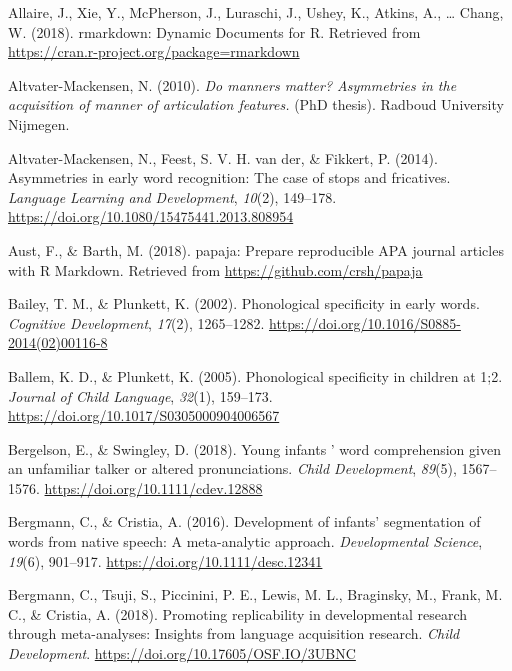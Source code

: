\documentclass[
  english,
  man, noextraspace]{apa6}
\newlength{\cslhangindent}
\newenvironment{cslreferences}%
  {\setlength{\parindent}{0pt}%
  \everypar{\setlength{\hangindent}{\cslhangindent}}\ignorespaces}%
  {\par}
\begin{document}
\hypertarget{refs}{}
\begin{cslreferences}
\leavevmode\hypertarget{ref-RMarkdown}{}%
Allaire, J., Xie, Y., McPherson, J., Luraschi, J., Ushey, K., Atkins, A., \ldots{} Chang, W. (2018). rmarkdown: Dynamic Documents for R. Retrieved from \url{https://cran.r-project.org/package=rmarkdown}

\leavevmode\hypertarget{ref-Altvater2010}{}%
Altvater-Mackensen, N. (2010). \emph{Do manners matter? Asymmetries in the acquisition of manner of articulation features.} (PhD thesis). Radboud University Nijmegen.

\leavevmode\hypertarget{ref-Altvater2014}{}%
Altvater-Mackensen, N., Feest, S. V. H. van der, \& Fikkert, P. (2014). Asymmetries in early word recognition: The case of stops and fricatives. \emph{Language Learning and Development}, \emph{10}(2), 149--178. \url{https://doi.org/10.1080/15475441.2013.808954}

\leavevmode\hypertarget{ref-papaja}{}%
Aust, F., \& Barth, M. (2018). papaja: Prepare reproducible APA journal articles with R Markdown. Retrieved from \url{https://github.com/crsh/papaja}

\leavevmode\hypertarget{ref-Bailey2002}{}%
Bailey, T. M., \& Plunkett, K. (2002). Phonological specificity in early words. \emph{Cognitive Development}, \emph{17}(2), 1265--1282. \url{https://doi.org/10.1016/S0885-2014(02)00116-8}

\leavevmode\hypertarget{ref-Ballem2005}{}%
Ballem, K. D., \& Plunkett, K. (2005). Phonological specificity in children at 1;2. \emph{Journal of Child Language}, \emph{32}(1), 159--173. \url{https://doi.org/10.1017/S0305000904006567}

\leavevmode\hypertarget{ref-Bergelson2017}{}%
Bergelson, E., \& Swingley, D. (2018). Young infants ' word comprehension given an unfamiliar talker or altered pronunciations. \emph{Child Development}, \emph{89}(5), 1567--1576. \url{https://doi.org/10.1111/cdev.12888}

\leavevmode\hypertarget{ref-Bergmann2016}{}%
Bergmann, C., \& Cristia, A. (2016). Development of infants' segmentation of words from native speech: A meta-analytic approach. \emph{Developmental Science}, \emph{19}(6), 901--917. \url{https://doi.org/10.1111/desc.12341}

\leavevmode\hypertarget{ref-Bergmann2018}{}%
Bergmann, C., Tsuji, S., Piccinini, P. E., Lewis, M. L., Braginsky, M., Frank, M. C., \& Cristia, A. (2018). Promoting replicability in developmental research through meta-analyses: Insights from language acquisition research. \emph{Child Development}. \url{https://doi.org/10.17605/OSF.IO/3UBNC}


\end{cslreferences}
\end{document}
